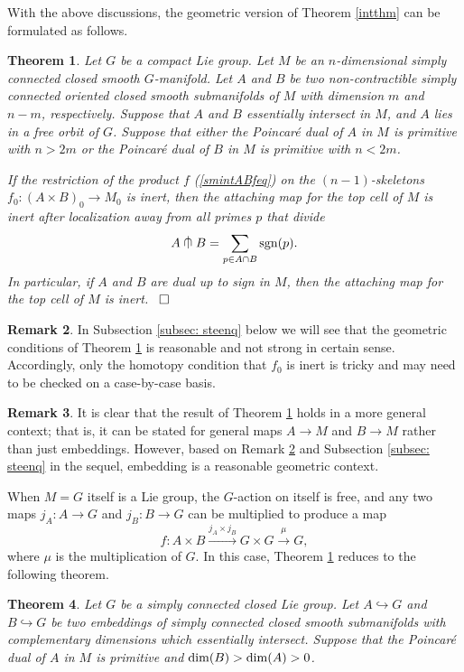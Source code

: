 \documentclass[a4]{amsart}
\newtheorem{theorem}{Theorem}[section]
\theoremstyle{definition}
\newtheorem{remark}[theorem]{Remark}
\newcommand{\testcap}{\mathrel{\vcenter{\offinterlineskip
\hbox{$\cap$}\vskip-1.8ex\hbox{$\kern0.2em | \kern0.15em$}}}}
\newcommand{\qqed}{\hfill\Box}
\begin{document}
\begin{sloppypar}
With the above discussions, the geometric version of Theorem \ref{intthm} can be formulated as follows. 
\begin{theorem}\label{smintthm}
Let $G$ be a compact Lie group. 
Let $M$ be an $n$-dimensional simply connected closed smooth $G$-manifold. 
Let $A$ and $B$ be two non-contractible simply connected oriented closed smooth submanifolds of $M$ with dimension $m$ and $n-m$, respectively. 
Suppose that $A$ and $B$ essentially intersect in $M$, and $A$ lies in a free orbit of $G$. 
Suppose that either the Poincar\'{e} dual of $A$ in $M$ is primitive with $n>2m$ or the Poincar\'{e} dual of $B$ in $M$ is primitive with $n<2m$. 

If the restriction of the product $f$ (\ref{smintABfeq}) on the $(n-1)$-skeletons 
$
f_0: (A\times B)_0\stackrel{}{\longrightarrow} M_0
$ 
is inert, 
then the attaching map for the top cell of $M$ is inert after localization away from all primes $p$ that divide 
\[
A\testcap B=\sum\limits_{p\in A\cap B} {\rm sgn}(p).
\]
In particular, if $A$ and $B$ are dual up to sign in $M$, then the attaching map for the top cell of $M$ is inert.  ~$\qqed$
\end{theorem}
 
 \begin{remark}\label{smintthm-cond-rmk}
In Subsection \ref{subsec: steenq} below we will see that the geometric conditions of Theorem \ref{smintthm} is reasonable and not strong in certain sense. Accordingly, only the homotopy condition that $f_0$ is inert is tricky and may need to be checked on a case-by-case basis. 
 \end{remark}
 
\begin{remark}\label{smintthm-result-rmk}
It is clear that the result of Theorem \ref{smintthm} holds in a more general context; that is, it can be stated for general maps $A\stackrel{}{\longrightarrow} M$ and $B\stackrel{}{\longrightarrow} M$ rather than just embeddings. However, based on Remark \ref{smintthm-cond-rmk} and Subsection \ref{subsec: steenq} in the sequel, embedding is a reasonable  geometric context. 
\end{remark}
 
When $M=G$ itself is a Lie group, the $G$-action on itself is free, and 
any two maps $j_A: A\stackrel{}{\longrightarrow} G$ and $j_B: B\longrightarrow G$ can be multiplied to produce a map
\begin{equation}\label{MGintABfeq}
f: A\times B \stackrel{j_A\times j_B}{\longrightarrow} G\times G\stackrel{\mu}{\longrightarrow} G,
\end{equation}
where $\mu$ is the multiplication of $G$. 
In this case, Theorem \ref{smintthm} reduces to the following theorem. 
\begin{theorem}\label{smMHintthm}
Let $G$ be a simply connected closed Lie group. 
Let $A\stackrel{}{\hookrightarrow} G$ and $B\stackrel{}{\hookrightarrow} G$ be two embeddings of simply connected closed smooth submanifolds with complementary dimensions which essentially intersect. 
Suppose that the Poincar\'{e} dual of $A$ in $M$ is primitive and ${\rm dim}(B)>{\rm dim}(A)>0$.


\end{theorem}
\end{sloppypar}
\end{document}
